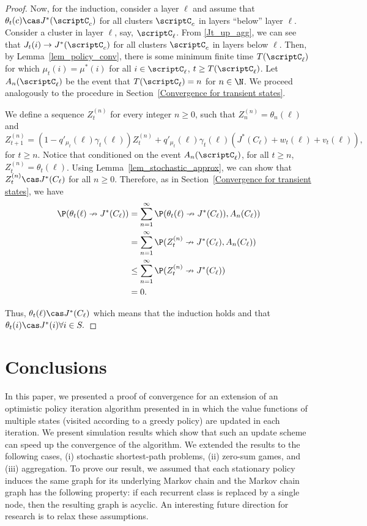 \documentclass[12pt]{article}
\begin{document}
\begin{proof}
Now, for the induction, consider a layer $\ell$ and assume that $\theta_t(c) \cas J^*(\scriptC_c)$ for all clusters $\scriptC_c$ in layers ``below'' layer $\ell$. Consider a cluster in layer $\ell$, say, $\scriptC_{\ell}$. From \ref{Jt_up_agg}, we can see that $J_t(i)\to J^*(\scriptC_c)$ for all clusters $\scriptC_c$ in layers below $\ell.$ Then, by Lemma~\ref{lem_policy_conv}, there is some minimum finite time $T(\scriptC_{\ell})$ for which $\mu_t(i) = \mu^*(i)$ for all $i \in \scriptC_{\ell}$, $t \geq T(\scriptC_{\ell})$. Let $A_n(\scriptC_{\ell})$ be the event that $T(\scriptC_{\ell}) = n$ for $n \in \N$. We proceed analogously to the procedure in Section~\ref{Convergence for transient states}.

We define a sequence $Z_t^{(n)}$ for every integer $n \geq 0$, such that $Z_n^{(n)} = \theta_n(\ell)$ and
\begin{equation}
    Z_{t+1}^{(n)} = (1 - q'_{\mu_t}(\ell)\gamma_t(\ell))Z_t^{(n)} + q'_{\mu_t}(\ell)\gamma_t(\ell)\left(J^*(C_{\ell}) + w_t(\ell) + v_t(\ell)\right),
\end{equation}
for $t \geq n$. Notice that conditioned on the event $A_n(\scriptC_\ell)$, for all $t \geq n$, $Z_t^{(n)}=\theta_t(\ell)$. Using Lemma~\ref{lem_stochastic_approx}, we can show that $Z_t^{(n)} \cas J^*(C_{\ell})$ for all $n \geq 0$. Therefore, as in Section~\ref{Convergence for transient states}, we have
\begin{align*}
    \P(\theta_t(\ell) \nrightarrow J^*(C_{\ell})) &= \sum_{n=1}^\infty \P(\theta_t(\ell) \nrightarrow J^*(C_{\ell})), A_n(C_{\ell}))\\
    &= \sum_{n=1}^\infty \P(Z_t^{(n)} \nrightarrow J^*(C_{\ell}), A_n(C_{\ell}))\\
    &\leq \sum_{n=1}^\infty \P(Z_t^{(n)} \nrightarrow J^*(C_{\ell}))\\
    &= 0.
\end{align*}

Thus, $\theta_t(\ell) \cas J^*(C_{\ell})$ which means that the induction holds and that $\theta_t(i)\cas J^*(i) \forall i \in S.$
\end{proof}

\section{Conclusions}
In this paper, we presented a proof of convergence for an extension of an optimistic policy iteration algorithm presented in \cite{tsitsiklis2002convergence} in which the value functions of multiple states (visited according to a greedy policy) are updated in each iteration. We present simulation results which show that such an update scheme can speed up the convergence of the algorithm. 
We extended the results to the following cases, (i) stochastic shortest-path problems, (ii) zero-sum games, and (iii) aggregation.
To prove our result, we assumed that each stationary policy induces the same graph for its underlying Markov chain and the Markov chain graph has the following property: if each recurrent class is replaced by a single node, then the resulting graph is acyclic. An interesting future direction for research is to relax these assumptions. 
\end{document}
